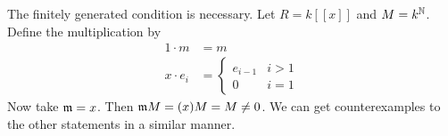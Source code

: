 \begin{rmk}
	The finitely generated condition is necessary.
	Let $R=k[[x]]$ and $M=k^{\mathbb{N}}$.
	Define the multiplication by
	\begin{align*}
		1 \cdot m &= m \\
		x \cdot e_i &=
			\begin{cases}
				e_{i-1} & i>1 \\
				0 & i=1
			\end{cases}
	\end{align*}
	Now take $\mathfrak{m} = x$.
	Then $\mathfrak{m} M = (x)M = M \neq 0$.
	We can get counterexamples to the other statements in a similar manner.
\end{rmk}
